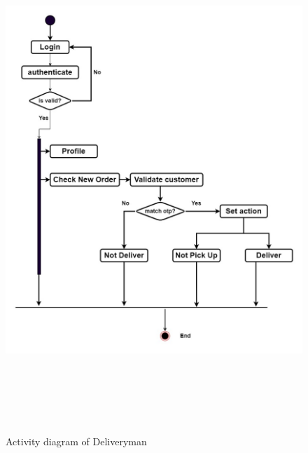 \begin{figure}[ht]
    \centering  
    \includegraphics[width=\textwidth,height=19cm]{acivity diagram/activity Diagram of deliveryman (1).jpg}    
    \caption{Activity diagram of Deliveryman}
    \label{fig:fig 4.13}
\end{figure}
